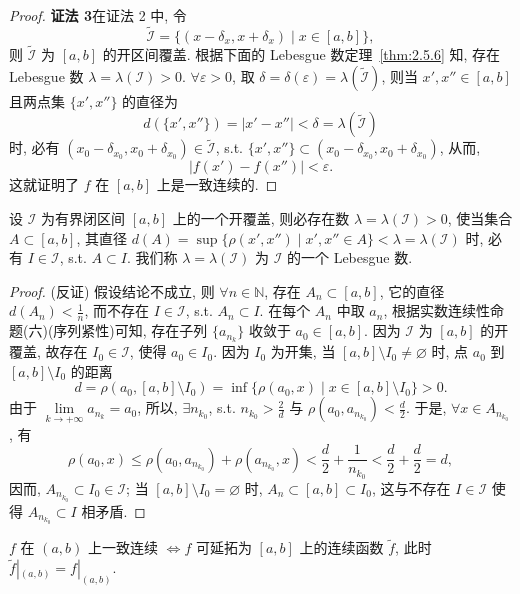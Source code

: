 \begin{proof}
\textbf{证法 3}\quad 在证法 2 中, 令
\[
\tilde{\mathcal{I}} = \{(x - \delta_x, x + \delta_x) \mid x \in [a,b]\},
\]
则 $\tilde{\mathcal{I}}$ 为 $[a,b]$ 的开区间覆盖. 根据下面的 Lebesgue 数定理~\ref{thm:2.5.6} 知, 存在 Lebesgue 数 $\lambda = \lambda(\mathcal{I}) > 0$. $\forall \varepsilon > 0$, 取 $\delta = \delta(\varepsilon) = \lambda(\tilde{\mathcal{I}})$, 则当 $x', x'' \in [a,b]$ 且两点集 $\{x', x''\}$ 的直径为
\[
d(\{x', x''\}) = |x' - x''| < \delta = \lambda(\tilde{\mathcal{I}})
\]
时, 必有 $(x_0 - \delta_{x_0}, x_0 + \delta_{x_0}) \in \tilde{\mathcal{I}}$, s.t. $\{x', x''\} \subset (x_0 - \delta_{x_0}, x_0 + \delta_{x_0})$, 从而,
\[
|f(x') - f(x'')| < \varepsilon.
\]
这就证明了 $f$ 在 $[a,b]$ 上是一致连续的.
\end{proof}

\begin{theorem}\label{thm:2.5.6}
设 $\mathcal{I}$ 为有界闭区间 $[a,b]$ 上的一个开覆盖, 则必存在数 $\lambda = \lambda(\mathcal{I}) > 0$, 使当集合 $A \subset [a,b]$, 其直径 $d(A) = \sup\{\rho(x', x'') \mid x', x'' \in A\} < \lambda = \lambda(\mathcal{I})$ 时, 必有 $I \in \mathcal{I}$, s.t. $A \subset I$. 我们称 $\lambda = \lambda(\mathcal{I})$ 为 $\mathcal{I}$ 的一个 Lebesgue 数.
\end{theorem}

\begin{proof}
(反证) 假设结论不成立, 则 $\forall n \in \mathbb{N}$, 存在 $A_n \subset [a,b]$, 它的直径 $d(A_n) < \frac{1}{n}$, 而不存在 $I \in \mathcal{I}$, s.t. $A_n \subset I$. 在每个 $A_n$ 中取 $a_n$, 根据实数连续性命题(六)(序列紧性)可知, 存在子列 $\{a_{n_k}\}$ 收敛于 $a_0 \in [a,b]$. 因为 $\mathcal{I}$ 为 $[a,b]$ 的开覆盖, 故存在 $I_0 \in \mathcal{I}$, 使得 $a_0 \in I_0$. 因为 $I_0$ 为开集, 当 $[a,b] \setminus I_0 \neq \varnothing$ 时, 点 $a_0$ 到 $[a,b] \setminus I_0$ 的距离
\[
d = \rho(a_0, [a,b] \setminus I_0) = \inf\{\rho(a_0, x) \mid x \in [a,b] \setminus I_0\} > 0.
\]
由于 $\lim\limits_{k \to +\infty} a_{n_k} = a_0$, 所以, $\exists n_{k_0}$, s.t. $n_{k_0} > \frac{2}{d}$ 与 $\rho(a_0, a_{n_{k_0}}) < \frac{d}{2}$. 于是, $\forall x \in A_{n_{k_0}}$, 有
\[
\rho(a_0, x) \leqslant \rho(a_0, a_{n_{k_0}}) + \rho(a_{n_{k_0}}, x) < \frac{d}{2} + \frac{1}{n_{k_0}} < \frac{d}{2} + \frac{d}{2} = d,
\]
因而, $A_{n_{k_0}} \subset I_0 \in \mathcal{I}$; 当 $[a,b] \setminus I_0 = \varnothing$ 时, $A_n \subset [a,b] \subset I_0$, 这与不存在 $I \in \mathcal{I}$ 使得 $A_{n_{k_0}} \subset I$ 相矛盾.
\end{proof}

\begin{theorem}\label{thm:2.5.7}
$f$ 在 $(a,b)$ 上一致连续 $\iff f$ 可延拓为 $[a,b]$ 上的连续函数 $\tilde{f}$, 此时 $\tilde{f}|_{(a,b)} = f|_{(a,b)}$.
\end{theorem}

